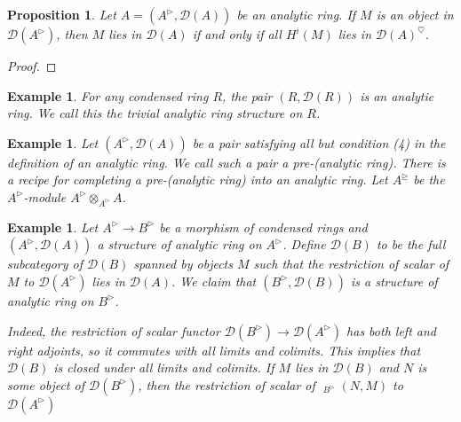 \documentclass{article}
\theoremstyle{plain}
\newtheorem{prop}[thm]{Proposition}
\newtheorem{exmp}[thm]{Example}
\theoremstyle{definition}
\theoremstyle{remark}
\DeclareMathOperator{\rhoms}{\underline{RHom}}
\newcommand{\huflag}{\triangleright}
\newcommand{\D}{\mathcal{D}}
\newcommand{\heart}{\heartsuit}
\begin{document}
\begin{prop}
Let $ A = (A ^{\huflag}, \D (A)) $ be an analytic ring.
If $ M $ is an object in $ \D (A ^{\huflag}) $, then $ M $ lies in $ \D (A) $ if and only if all $ H ^{i}(M) $ lies in $ \D (A)^{\heart} $.
\end{prop}

\begin{proof}

\end{proof}

\begin{exmp}
For any condensed ring $ R $, the pair $ (R, \D (R)) $ is an analytic ring. We call this the trivial analytic ring structure on $ R $.
\end{exmp}

\begin{exmp}
Let $ (A ^{\huflag}, \D (A)) $ be a pair satisfying all but condition (4) in the definition of an analytic ring.
We call such a pair a \emph{pre-(analytic ring)}.
There is a recipe for completing a pre-(analytic ring) into an analytic ring.
Let $ A ^{\trianglerighteq} $ be the $ A ^{\huflag} $-module $ A ^{\huflag} \otimes _{A ^{\huflag}} A $.
\end{exmp}

\begin{exmp}
Let $ A ^{\huflag}\to B ^{\huflag} $ be a morphism of condensed rings and $ (A ^{\huflag}, \D (A)) $ a structure of analytic ring on $ A ^{\huflag} $.
Define $ \D (B) $ to be the full subcategory of $ \D (B) $ spanned by objects $ M $ such that the restriction of scalar of $ M $ to $ \D (A ^{\huflag}) $
lies in $ \D (A) $. We claim that $ (B ^{\huflag}, \D(B)) $ is a structure of analytic ring on $ B ^{\huflag} $.

Indeed, the restriction of scalar functor $ \D (B ^{\huflag})\to \D (A ^{\huflag}) $ has both left and right adjoints, so it commutes with all limits and colimits.
This implies that $ \D (B) $ is closed under all limits and colimits.
If $ M $ lies in $ \D (B) $ and $ N $ is some object of $ \D (B ^{\huflag}) $,
then the restriction of scalar of $ \rhoms _{B ^{\huflag}}(N, M) $ to $ \D (A ^{\huflag}) $
\end{exmp}
\appendix


\printbibliography
\end{document}
